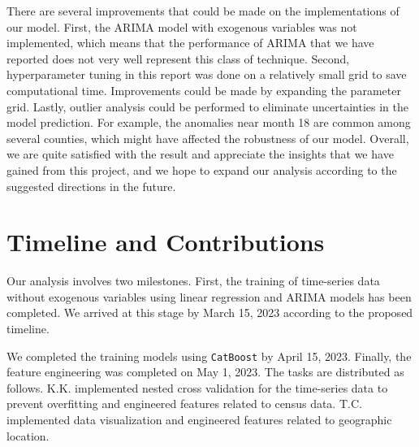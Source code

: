 \documentclass[prl,aps,superscriptaddress,twocolumn,10pt,nolongbibliography]{revtex4-2}
\begin{document}
There are several improvements that could be made on the implementations of our model.
First, the ARIMA model with exogenous variables was not implemented, which means that the performance of ARIMA that we have reported does not very well represent this class of technique.  
Second, hyperparameter tuning in this report was done on a relatively small grid to save computational time. Improvements could be made by expanding the parameter grid. 
Lastly, outlier analysis could be performed to eliminate uncertainties in the model prediction. For example, the anomalies near month 18 are common among several counties, which might have affected the robustness of our model. 
Overall, we are quite satisfied with the result and appreciate the insights that we have gained from this project, and we hope to expand our analysis according to the suggested directions in the future. 

\section{Timeline and Contributions}
Our analysis involves two milestones. 
First, the training of time-series data without exogenous variables using linear regression and ARIMA models has been completed.
We arrived at this stage by March 15, 2023 according to the proposed timeline.

We completed the training models using \lstinline{CatBoost} by April 15, 2023. 
Finally, the feature engineering was completed on May 1, 2023.
The tasks are distributed as follows. 
K.K. implemented nested cross validation for the time-series data to prevent overfitting and engineered features related to census data.
T.C. implemented data visualization and engineered features related to geographic location.

{}
\end{document}
